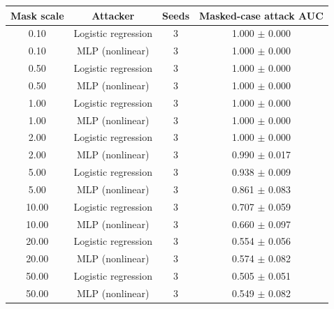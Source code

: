 \begin{tabular}{cccc}
\toprule
Mask scale & Attacker & Seeds & Masked-case attack AUC \\
\midrule
0.10 & Logistic regression & 3 & 1.000 $\pm$ 0.000 \\
0.10 & MLP (nonlinear) & 3 & 1.000 $\pm$ 0.000 \\
0.50 & Logistic regression & 3 & 1.000 $\pm$ 0.000 \\
0.50 & MLP (nonlinear) & 3 & 1.000 $\pm$ 0.000 \\
1.00 & Logistic regression & 3 & 1.000 $\pm$ 0.000 \\
1.00 & MLP (nonlinear) & 3 & 1.000 $\pm$ 0.000 \\
2.00 & Logistic regression & 3 & 1.000 $\pm$ 0.000 \\
2.00 & MLP (nonlinear) & 3 & 0.990 $\pm$ 0.017 \\
5.00 & Logistic regression & 3 & 0.938 $\pm$ 0.009 \\
5.00 & MLP (nonlinear) & 3 & 0.861 $\pm$ 0.083 \\
10.00 & Logistic regression & 3 & 0.707 $\pm$ 0.059 \\
10.00 & MLP (nonlinear) & 3 & 0.660 $\pm$ 0.097 \\
20.00 & Logistic regression & 3 & 0.554 $\pm$ 0.056 \\
20.00 & MLP (nonlinear) & 3 & 0.574 $\pm$ 0.082 \\
50.00 & Logistic regression & 3 & 0.505 $\pm$ 0.051 \\
50.00 & MLP (nonlinear) & 3 & 0.549 $\pm$ 0.082 \\
\bottomrule
\end{tabular}
